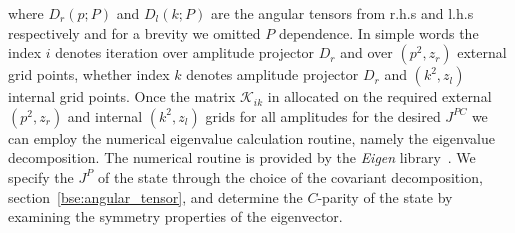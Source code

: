 \eeqa
where $D_{r}(p;P)$ and $D_{l}(k;P)$ are the angular tensors from r.h.s and l.h.s respectively and for a brevity we omitted $P$ dependence. In simple words the index $i$ denotes iteration over amplitude projector $D_{r}$ and over $(p^2,z_r)$ external grid points, whether index $k$ denotes amplitude projector $D_{r}$ and $(k^2,z_l)$ internal grid points. Once the matrix $\mathcal{K}_{ik}$ in allocated on the required external $(p^2,z_r)$ and internal $(k^2,z_l)$ grids for all amplitudes for the desired $J^{PC}$ we can employ the numerical eigenvalue calculation routine, namely the eigenvalue decomposition. The numerical routine is provided by the \emph{Eigen} library~\cite{eigenweb}. We specify the $J^P$ of the state through the choice of the covariant decomposition, section~\ref{bse:angular_tensor}, and determine the $C$-parity of the state by examining the symmetry properties of the eigenvector. \\